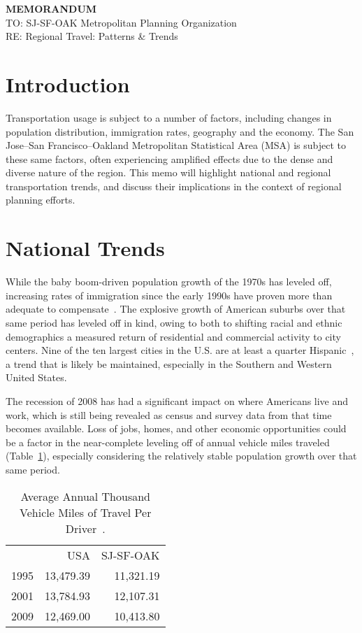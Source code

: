 \documentclass[12pt]{article}
\begin{document}
\thispagestyle{empty} 			%

\textbf{\large MEMORANDUM}\\
TO: SJ-SF-OAK Metropolitan Planning Organization\\
RE: Regional Travel: Patterns \& Trends
\section{Introduction}
Transportation usage is subject to a number of factors, including changes in population distribution, immigration rates, geography and the economy. The San Jose--San Francisco--Oakland Metropolitan Statistical Area (MSA) is subject to these same factors, often experiencing amplified effects due to the dense and diverse nature of the region. This memo will highlight national and regional transportation trends, and discuss their implications in the context of regional planning efforts. 

\section{National Trends}
While the baby boom-driven population growth of the 1970s has leveled off, increasing rates of immigration since the early 1990s have proven more than adequate to compensate~\citep{pisarski2006commuting}. The explosive growth of American suburbs over that same period has leveled off in kind, owing to both to shifting racial and ethnic demographics a measured return of residential and commercial activity to city centers. Nine of the ten largest cities in the U.S. are at least a quarter Hispanic~\citep{USACENSUS}, a trend that is likely be maintained, especially in the Southern and Western United States. 

The recession of 2008 has had a significant impact on where Americans live and work, which is still being revealed as census and survey data from that time becomes available. Loss of jobs, homes, and other economic opportunities could be a factor in the near-complete leveling off of annual vehicle miles traveled (Table~\ref{table:VMT}), especially considering the relatively stable population growth over that same period. 



\begin{table}
\begin{center}
 \begin{tabular}{rrr}
       & USA & SJ-SF-OAK \\
\cline{2-3}
 1995  & 13,479.39 & 11,321.19 \\
 2001  & 13,784.93 & 12,107.31 \\
 2009  & 12,469.00 & 10,413.80 \\
 \end{tabular}%
 \caption{Average Annual Thousand Vehicle Miles of Travel Per Driver~\citep{DOT2009NHTS}.}
 \label{table:VMT}
 \end{center}
\end{table}
\end{document}
